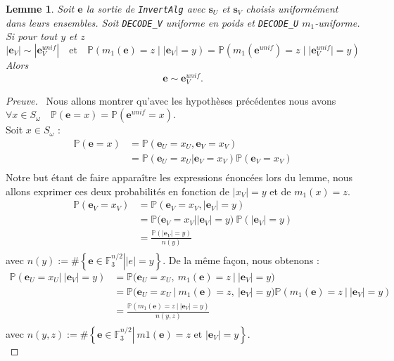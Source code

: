 \documentclass[12pt]{article}
\theoremstyle{plain}
\newtheorem{lemme}[thm]{Lemme}
\newcommand{\F}{\mathbb{F}}
\newcommand{\e}{\mathbf{e}}
\begin{document}
\begin{lemme} Soit $\mathbf{e}$ la sortie de \verb|InvertAlg| avec $\mathbf{s}_U$ et $\mathbf{s}_V$ choisis uniformément dans leurs ensembles. Soit \verb|DECODE_V| uniforme en poids et \verb|DECODE_U| $m_1$-uniforme. Si pour tout $y$ et $z$ 
$$|\mathbf{e}_V| \sim |\mathbf{e}_V^{unif}|\quad \text{et} \quad\mathbb{P}(m_1(\mathbf{e}) = z\; |\; |\mathbf{e}_V| = y) = \mathbb{P}(m_1(\mathbf{e}^{unif}) = z\; |\; |\mathbf{e}_V^{unif}| = y)$$
Alors
$$ \mathbf{e} \sim \mathbf{e}_V^{unif}.$$
\end{lemme}

\begin{proof}[Preuve]\
Nous allons montrer qu'avec les hypothèses précédentes nous avons $\forall x \in S_{\omega} \quad \mathbb{P}(\e = x) = \mathbb{P}(\e^{unif} = x)$.\\
Soit $x \in S_{\omega}$ :
\begin{equation*}
\begin{split}
\mathbb{P}(\e = x) &= \mathbb{P}(\e_U = x_U, \e_V = x_V)\\
&= \mathbb{P}(\e_U = x_U | \e_V = x_V)\mathbb{P}(\e_V = x_V)\\
\end{split}
\end{equation*}
Notre but étant de faire apparaître les expressions énoncées lors du lemme, nous allons exprimer ces deux probabilités en fonction de $|x_V| = y$ et de $m_1(x) = z$.
\begin{equation*}
\begin{split}
\mathbb{P}(\e_V = x_V) &= \mathbb{P}(\e_V = x_V, |\e_V| = y)\\
&= \left.\mathbb{P}(\e_V = x_V \right| |\e_V| = y)\ \mathbb{P}(|\e_V| = y)\\
&= \frac{\mathbb{P}(|\e_V| = y)}{n(y)}\\
\end{split}
\end{equation*}
avec $n(y) := \#\left\{ \left.\e \in \F_3^{n/2} \right| |e| = y\right\}$.
De la même façon, nous obtenons :
{\footnotesize \begin{equation*}
\begin{split}
\mathbb{P}(\e_U = x_U |\ |\e_V| = y) &= \left.\mathbb{P}(\e_U = x_U ,\ m_1(\e) = z\ \right|\ |\e_V| = y)\\
&= \left.\mathbb{P}(\e_U = x_U\ \right|\ m_1(\e) = z,\ |\e_V| = y)\mathbb{P}(m_1(\e) = z\ |\ |\e_V| = y)\\
&= \frac{\mathbb{P}(m_1(\e) = z\ |\ |\e_V| = y)}{n(y,z)}\\
\end{split}
\end{equation*}}
avec $n(y,z) := \#\left\{ \left.\e \in \F_3^{n/2} \right|\  m1(\e) = z\text{ et } |\e_V| = y \right\}$.\\


\end{proof}
\end{document}
